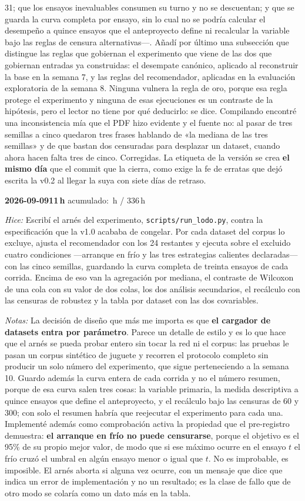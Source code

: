 \documentclass[11pt,letterpaper]{article}
\newcommand{\presupuesto}{336}
\newcommand{\horasacum}{0}
\newcommand{\entrada}[4]{%
  \xdef\horasacum{\fpeval{\horasacum + #2}}%
  \par\medskip
  \noindent\textbf{\color{tecnavy}#1}\quad\textbf{#2\,h}%
  \hfill{\small\color{gris}acumulado: \horasacum\,h / \presupuesto\,h}\par
  \nopagebreak
  \noindent\textit{Hice:} #3\par
  \nopagebreak
  \noindent\textit{Notas:} #4\par
}
\begin{document}
{ 31; que los ensayos inevaluables consumen su turno y no se descuentan; y que se guarda la
 curva completa por ensayo, sin lo cual no se podría calcular el desempeño a quince ensayos
 que el anteproyecto define ni recalcular la variable bajo las reglas de censura
 alternativas—. Añadí por último una subsección que distingue las reglas que gobiernan el
 experimento que viene de las dos que gobiernan entradas ya construidas: el desempate
 canónico, aplicado al reconstruir la base en la semana 7, y las reglas del recomendador,
 aplicadas en la evaluación exploratoria de la semana 8. Ninguna vulnera la regla de oro,
 porque esa regla protege el experimento y ninguna de esas ejecuciones es un contraste de la
 hipótesis, pero el lector no tiene por qué deducirlo: se dice. Compilando encontré una
 inconsistencia mía que el PDF hizo evidente y el fuente no: al pasar de tres semillas a
 cinco quedaron tres frases hablando de «la mediana de las tres semillas» y de que bastan
 dos censuradas para desplazar un dataset, cuando ahora hacen falta tres de cinco.
 Corregidas. La etiqueta de la versión se crea \textbf{el mismo día} que el commit que la
 cierra, como exige la fe de erratas que dejó escrita la v0.2 al llegar la suya con siete
 días de retraso.}

\entrada{2026-09-09}{11}
{Escribí el arnés del experimento, \texttt{scripts/run\_lodo.py}, contra la
 especificación que la v1.0 acababa de congelar. Por cada dataset del corpus lo excluye,
 ajusta el recomendador con los 24 restantes y ejecuta sobre el excluido cuatro
 condiciones —arranque en frío y las tres estrategias calientes declaradas— con las cinco
 semillas, guardando la curva completa de treinta ensayos de cada corrida. Encima de eso
 van la agregación por mediana, el contraste de Wilcoxon de una cola con su valor de dos
 colas, los dos análisis secundarios, el recálculo con las censuras de robustez y la tabla
 por dataset con las dos covariables.}
{La decisión de diseño que más me importa es que \textbf{el cargador de datasets entra por
 parámetro}. Parece un detalle de estilo y es lo que hace que el arnés se pueda probar
 entero sin tocar la red ni el corpus: las pruebas le pasan un corpus sintético de juguete
 y recorren el protocolo completo sin producir un solo número del experimento, que sigue
 perteneciendo a la semana 10. Guardo además la curva entera de cada corrida y no el número
 resumen, porque de esa curva salen tres cosas: la variable primaria, la medida descriptiva
 a quince ensayos que define el anteproyecto, y el recálculo bajo las censuras de 60 y 300;
 con solo el resumen habría que reejecutar el experimento para cada una. Implementé además
 como comprobación activa la propiedad que el pre-registro demuestra: \textbf{el arranque en
 frío no puede censurarse}, porque el objetivo es el 95\% de su propio mejor valor, de modo
 que si ese máximo ocurre en el ensayo $t$ el frío cruzó el umbral en algún ensayo menor o
 igual que $t$. No es improbable, es imposible. El arnés aborta si alguna vez ocurre, con un
 mensaje que dice que indica un error de implementación y no un resultado; es la clase de
 fallo que de otro modo se colaría como un dato más en la tabla.}
\end{document}
